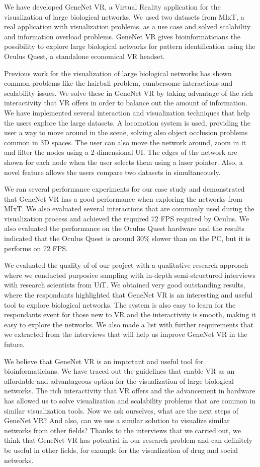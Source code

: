 We have developed GeneNet VR, a Virtual Reality application for the visualization of large biological networks. We used two datasets from MIxT, a real application with visualization problems, as a use case and solved scalability and information overload problems. GeneNet VR gives bioinformaticians the possibility to explore large biological networks for pattern identification using the Oculus Quest, a standalone economical VR headset.

Previous work for the visualization of large biological networks has shown common problems like the hairball problem, cumbersome interactions and scalability issues. We solve these in GeneNet VR by taking advantage of the rich interactivity that VR offers in order to balance out the amount of information. We have implemented several interaction and visualization techniques that help the users explore the large datasets. A locomotion system is used, providing the user a way to move around in the scene, solving also object occlusion problems common in 3D spaces. The user can also move the network around, zoom in it and filter the nodes using a 2-dimensional UI. The edges of the network are shown for each node when the user selects them using a laser pointer. Also, a novel feature allows the users compare two datasets in simultaneously.

We ran several performance experiments for our case study and demonstrated that GeneNet VR has a good performance when exploring the networks from MIxT. We also evaluated several interactions that are commonly used during the visualization process and achieved the required 72 FPS required by Oculus. We also evaluated the performance on the Oculus Quest hardware and the results indicated that the Oculus Quest is around 30\% slower than on the PC, but it is performs on 72 FPS.

We evaluated the quality of of our project with a qualitative research approach where we conducted purposive sampling with in-depth semi-structured interviews with research scientists from UiT. We obtained very good outstanding results, where the respondants highlighted that GeneNet VR is an interesting and useful tool to explore biological networks. The system is also easy to learn for the respondants event for those new to VR and the interactivity is smooth, making it easy to explore the networks. We also made a list with further requirements that we extracted from the interviews that will help us improve GeneNet VR in the future.

We believe that GeneNet VR is an important and useful tool for bioinformaticians. We have traced out the guidelines that enable VR as an affordable and advantageous option for the visualization of large biological networks. The rich interactivity that VR offers and the advancement in hardware has allowed us to solve visualization and scalability problems that are common in similar visualization tools. Now we ask ourselves, what are the next steps of GeneNet VR? And also, can we use a similar solution to visualize similar networks from other fields? Thanks to the interviews that we carried out, we think that GeneNet VR has potential in our research problem and can definitely be useful in other fields, for example for the visualization of drug and social networks.
